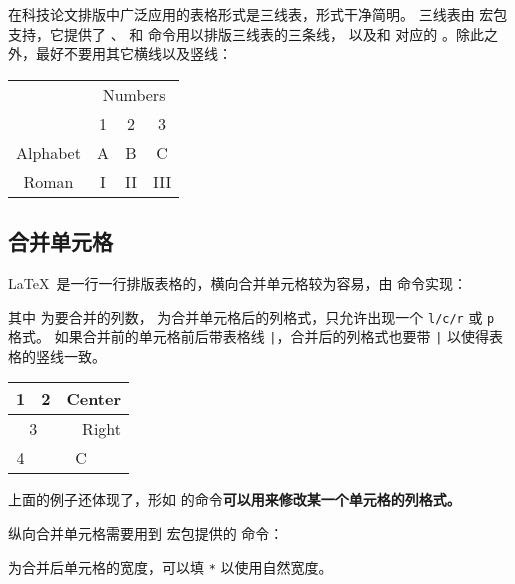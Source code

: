 在科技论文排版中广泛应用的表格形式是三线表，形式干净简明。
三线表由  宏包支持，它提供了 、 和  命令用以排版三线表的三条线，
以及和  对应的 。除此之外，最好不要用其它横线以及竖线：
\begin{example}
\begin{tabular}{cccc}
  \toprule
   & \multicolumn{3}{c}{Numbers} \\
  \cmidrule{2-4}
           & 1 & 2 & 3 \\
  \midrule
  Alphabet & A & B & C \\
  Roman    & I & II& III \\
  \bottomrule
\end{tabular}
\end{example}

\subsection{合并单元格}\label{subsec:tabular-multicol}

\LaTeX\ 是一行一行排版表格的，横向合并单元格较为容易，由  命令实现：
\begin{command}
\end{command}
其中  为要合并的列数， 为合并单元格后的列格式，只允许出现一个 \texttt{l/c/r} 或 \texttt{p} 格式。
如果合并前的单元格前后带表格线 \texttt|，合并后的列格式也要带 \texttt| 以使得表格的竖线一致。
\begin{example}
\begin{tabular}{|c|c|c|}
  \hline
  1 & 2 & Center \\ \hline
  \multicolumn{2}{|c|}{3} &
  \multicolumn{1}{r|}{Right} \\ \hline
  4 & \multicolumn{2}{c|}{C} \\ \hline
\end{tabular}
\end{example}

上面的例子还体现了，形如  的命令\textbf{可以用来修改某一个单元格的列格式。}

纵向合并单元格需要用到  宏包提供的  命令：
\begin{command}
\end{command}
 为合并后单元格的宽度，可以填 \texttt{*} 以使用自然宽度。


